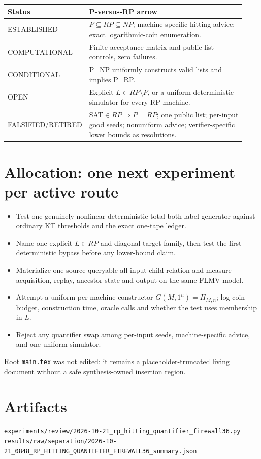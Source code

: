 \documentclass[11pt]{article}
\begin{document}
\medskip
\begin{tabular}{p{0.18\linewidth}p{0.75\linewidth}}
\toprule
Status & P-versus-RP arrow \\
\midrule
ESTABLISHED & $P\subseteq RP\subseteq NP$; machine-specific hitting advice;
exact logarithmic-coin enumeration. \\
COMPUTATIONAL & Finite acceptance-matrix and public-list controls, zero
failures. \\
CONDITIONAL & P=NP uniformly constructs valid lists and implies P=RP. \\
OPEN & Explicit $L\in RP\setminus P$, or a uniform deterministic simulator
for every RP machine. \\
FALSIFIED/RETIRED & SAT$\in RP\Rightarrow P=RP$; one public list; per-input
good seeds; nonuniform advice; verifier-specific lower bounds as resolutions. \\
\bottomrule
\end{tabular}

\section*{Allocation: one next experiment per active route}
\begin{itemize}
\item[:00 MCSP.] Test one genuinely nonlinear deterministic total both-label
generator against ordinary KT thresholds and the exact one-tape ledger.
\item[:12 RP separation.] Name one explicit $L\in RP$ and diagonal target
family, then test the first deterministic bypass before any lower-bound claim.
\item[:24 ARC.] Materialize one source-queryable all-input child relation and
measure acquisition, replay, ancestor state and output on the same FLMV model.
\item[:36 RP derandomization.] Attempt a uniform per-machine constructor
$G(M,1^n)=H_{M,n}$; log coin budget, construction time, oracle calls and whether
the test uses membership in $L$.
\item[:48 synthesis.] Reject any quantifier swap among per-input seeds,
machine-specific advice, and one uniform simulator.
\end{itemize}

Root \texttt{main.tex} was not edited: it remains a placeholder-truncated
living document without a safe synthesis-owned insertion region.

\section*{Artifacts}
\nolinkurl{experiments/review/2026-10-21_rp_hitting_quantifier_firewall36.py}
\newline
\nolinkurl{results/raw/separation/2026-10-21_0848_RP_HITTING_QUANTIFIER_FIREWALL36_summary.json}

\end{document}
